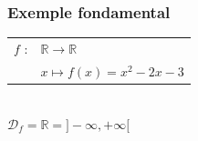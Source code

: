 \subsubsection{Exemple fondamental}


\begin{tabular}{l@{$\;$ }l}
  $f$ : & $ \mathbb{R} \longrightarrow \mathbb{R}$  \\
        & $ x \longmapsto f(x) = x^2 -2x -3 $ \\
\end{tabular}\\

$\mathscr{D}_f = \mathbb{R} = ] -\infty, +\infty [ $ \\

\centerline{} 

\newpage



